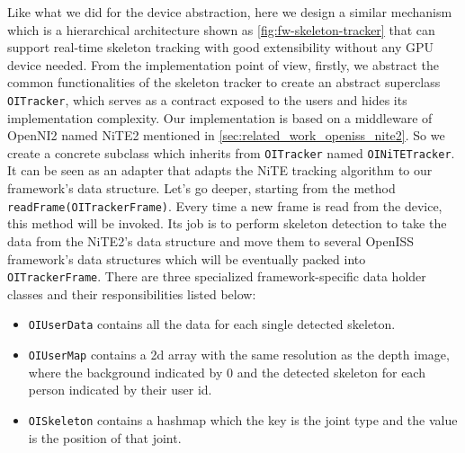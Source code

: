 Like what we did for the device abstraction, here we design a similar mechanism
which is a hierarchical architecture shown as \autoref{fig:fw-skeleton-tracker}
that can support real-time skeleton tracking with good extensibility without
any GPU device needed.
From the implementation point of view, firstly, we abstract the common
functionalities of the skeleton tracker to create an abstract superclass
\texttt{OITracker}, which serves as a contract exposed to the users and hides its
implementation complexity.
Our implementation is based on a middleware of OpenNI2 named NiTE2
mentioned in \autoref{sec:related_work_openiss_nite2}. So we create a concrete
subclass which inherits from \texttt{OITracker} named \texttt{OINiTETracker}.
It can be seen as an adapter that adapts the NiTE tracking algorithm to our
framework's data structure.
Let's go deeper, starting from the method \texttt{readFrame(OITrackerFrame)}.
Every time a new frame is read from the device, this method will be
invoked. Its job is to perform skeleton detection to take the data from the
NiTE2's data structure and move them to several OpenISS framework's data
structures which will be eventually packed into \texttt{OITrackerFrame}.
There are three specialized framework-specific data holder classes and their
responsibilities listed below:

\begin{itemize}
    \item \texttt{OIUserData} contains all the data for each single
    detected skeleton.
    \item \texttt{OIUserMap} contains a 2d array with the same resolution
    as the depth image, where the background indicated by 0 and the detected
    skeleton for each person indicated by their user id.
    \item \texttt{OISkeleton} contains a hashmap which the key is the joint
    type and the value is the position of that joint.
\end{itemize}

